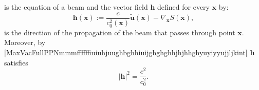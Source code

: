 \documentclass{article}
\theoremstyle{definition}
\theoremstyle{remark}
\renewcommand{\vec}[1]{\mathbf{#1}}
\newcommand{\er}{\eqref}
\newcommand{\er}{\eqref}
\begin{document}
is the equation of a beam and the vector field $\vec h$ defined for
every $\vec x$ by:
\begin{equation}\label{MaxVacFullPPNmmmffffffiuiuhjuughbghhiuijghghghhhfhhghghguygtjuuujjjkyuuyint}
\vec h(\vec x):=\frac{c}{c^2_0(\vec x)}\vec {\tilde u}(\vec
x)-\nabla_{\vec x}S(\vec x),
\end{equation}
is the direction of the propagation of the beam that passes through
point $\vec x$. Moreover, by
\er{MaxVacFullPPNmmmffffffiuiuhjuughbghhiuijghghghhjhjhhghyuyiyyujjljkint}
$\vec h$ satisfies
\begin{equation}\label{MaxVacFullPPNmmmffffffiuiuhjuughbghhiuijghghghhjhjhhghyuyiyyujjljkgghhgint}
|\vec h|^2=\frac{c^2}{c^2_0}.
\end{equation}
%
%
%
%
\begin{comment}
Next, under the approximation \er{ojhkkint}
consider a curve $\vec r(s):[a,b]\to\mathbb{R}^3$ with endpoints
$\vec r(a)=N$ and $\vec r(b)=M$. Then integrating the square root of
both sides of
\er{MaxVacFullPPNmmmffffffiuiuhjuughbghhiuijghghghhjhjhhghyuyiyyujjljkint}
over the curve $\vec r(s)$ we deduce
\begin{equation}\label{MaxMedFullGGffgggyyojjhhjkhjyyiuhggjhhjhuyytytyuuytrrtghjtyuggyuighjuyioyyfgffhyuhhghzzrrhhkkkint}
\int_a^b\left|\frac{c}{c^2_0\left(\vec r(s)\right)}\vec {\tilde
u}\left(\vec r(s)\right)-\nabla_{\vec x}S\left(\vec
r(s)\right)\right|\,\left|\vec
r'(s)\right|ds=\int_a^b\frac{c}{c_0\left(\vec r(s)\right)}\left|\vec
r'(s)\right|ds.
\end{equation}
Thus in particular,
\begin{equation}\label{MaxMedFullGGffgggyyojjhhjkhjyyiuhggjhhjhuyytytyuuytrrtghjtyuggyuighjuyioyyfgffhyuhhghzzrriuihhkkkint}
\int_a^b\left(\frac{c}{c^2_0\left(\vec r(s)\right)}\vec {\tilde
u}\left(\vec r(s)\right)-\nabla_{\vec x}S\left(\vec
r(s)\right)\right)\cdot\vec
r'(s)ds\leq\int_a^b\frac{c}{c_0\left(\vec r(s)\right)}\left|\vec
r'(s)\right|ds,
\end{equation}
i.e.
\begin{equation}\label{MaxMedFullGGffgggyyojjhhjkhjyyiuhggjhhjhuyytytyuuytrrtghjtyuggyuighjuyioyyfgffhyuhhghzzrrkkijjhjhhkkkint}
\left(-S(M)\right)-
\left(-S(N)\right)\leq\int_a^b\frac{c}{c_0\left(\vec

\end{comment}
\end{document}
